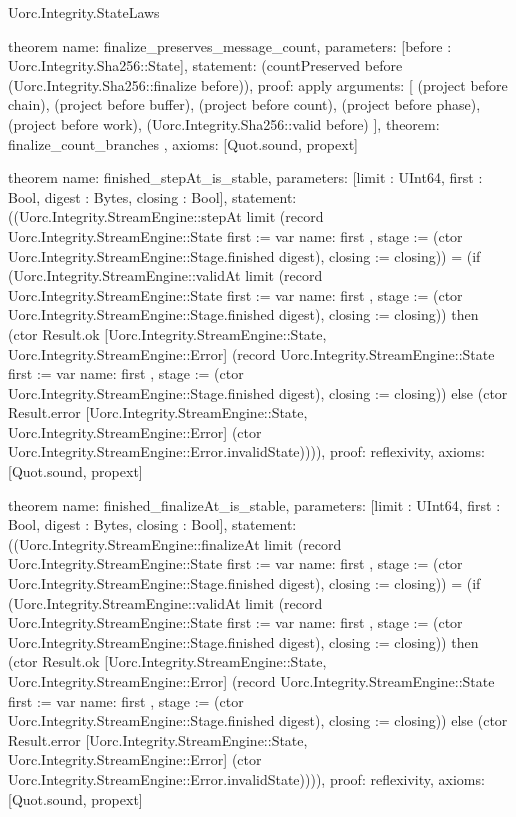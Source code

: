 \begin{lexlean}{Uorc.Integrity.StateLaws}
\begin{semanticmodule}
theorem{
  name: finalize_preserves_message_count,
  parameters: [before : Uorc.Integrity.Sha256::State],
  statement: (countPreserved before (Uorc.Integrity.Sha256::finalize before)),
  proof: apply{
    arguments: [
      (project before chain),
      (project before buffer),
      (project before count),
      (project before phase),
      (project before work),
      (Uorc.Integrity.Sha256::valid before)
    ],
    theorem: finalize_count_branches
  },
  axioms: [Quot.sound, propext]
}

theorem{
  name: finished_stepAt_is_stable,
  parameters: [limit : UInt64, first : Bool, digest : Bytes, closing : Bool],
  statement: ((Uorc.Integrity.StreamEngine::stepAt limit (record Uorc.Integrity.StreamEngine::State {first := var{
    name: first
  }, stage := (ctor Uorc.Integrity.StreamEngine::Stage.finished digest), closing := closing})) = (if (Uorc.Integrity.StreamEngine::validAt limit (record Uorc.Integrity.StreamEngine::State {first := var{
    name: first
  }, stage := (ctor Uorc.Integrity.StreamEngine::Stage.finished digest), closing := closing})) then (ctor Result.ok [Uorc.Integrity.StreamEngine::State, Uorc.Integrity.StreamEngine::Error] (record Uorc.Integrity.StreamEngine::State {first := var{
    name: first
  }, stage := (ctor Uorc.Integrity.StreamEngine::Stage.finished digest), closing := closing})) else (ctor Result.error [Uorc.Integrity.StreamEngine::State, Uorc.Integrity.StreamEngine::Error] (ctor Uorc.Integrity.StreamEngine::Error.invalidState)))),
  proof: reflexivity{},
  axioms: [Quot.sound, propext]
}

theorem{
  name: finished_finalizeAt_is_stable,
  parameters: [limit : UInt64, first : Bool, digest : Bytes, closing : Bool],
  statement: ((Uorc.Integrity.StreamEngine::finalizeAt limit (record Uorc.Integrity.StreamEngine::State {first := var{
    name: first
  }, stage := (ctor Uorc.Integrity.StreamEngine::Stage.finished digest), closing := closing})) = (if (Uorc.Integrity.StreamEngine::validAt limit (record Uorc.Integrity.StreamEngine::State {first := var{
    name: first
  }, stage := (ctor Uorc.Integrity.StreamEngine::Stage.finished digest), closing := closing})) then (ctor Result.ok [Uorc.Integrity.StreamEngine::State, Uorc.Integrity.StreamEngine::Error] (record Uorc.Integrity.StreamEngine::State {first := var{
    name: first
  }, stage := (ctor Uorc.Integrity.StreamEngine::Stage.finished digest), closing := closing})) else (ctor Result.error [Uorc.Integrity.StreamEngine::State, Uorc.Integrity.StreamEngine::Error] (ctor Uorc.Integrity.StreamEngine::Error.invalidState)))),
  proof: reflexivity{},
  axioms: [Quot.sound, propext]
}


\end{semanticmodule}
\end{lexlean}
